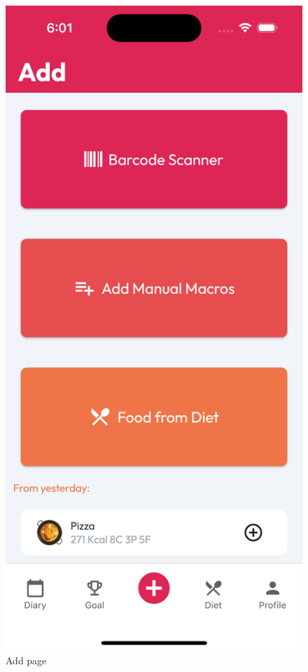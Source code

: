 \documentclass{Configuration_Files/PoliMi3i_thesis}
\begin{document}
\begin{figure}[!h]
  \includegraphics[scale=0.1]{Images/Screenshots/Mobile/AddLight.png}
  \caption{Add page}
\end{figure}

\clearpage
\end{document}
